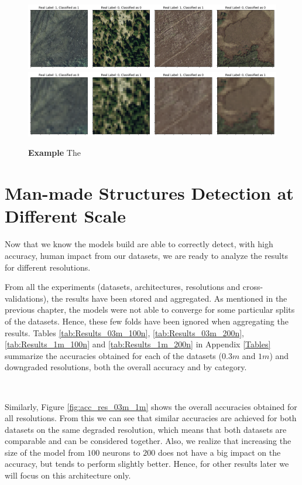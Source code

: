 \begin{figure}[h!]
	\centering
	\captionsetup{width=1\linewidth}
	\includegraphics[width=1\textwidth]{Figures/results/class_dataset03m_res03_comp_correct.png}
	\includegraphics[width=1\textwidth]{Figures/results/class_dataset03m_res48_comp_wrong.png}
	\caption{\textbf{Example} The }
	\label{fig:dataset03m_res03_res48_comp}
\end{figure}


\section{Man-made Structures Detection at Different Scale}

Now that we know the models build are able to correctly detect, with high accuracy, human impact from our datasets, we are ready to analyze the results for different resolutions.

From all the experiments (datasets, architectures, resolutions and cross-validations), the results have been stored and aggregated. As mentioned in the previous chapter, the models were not able to converge for some particular splits of the datasets. Hence, these few folds have been ignored when aggregating the results. Tables \ref{tab:Results_03m_100n}, \ref{tab:Results_03m_200n}, \ref{tab:Results_1m_100n} and \ref{tab:Results_1m_200n} in Appendix \ref{Tables} summarize the accuracies obtained for each of the datasets ($0.3m$ and $1m$) and downgraded resolutions, both the overall accuracy and by category. 

\

Similarly, Figure \ref{fig:acc_res_03m_1m} shows the overall accuracies obtained for all resolutions. From this we can see that similar accuracies are achieved for both datasets on the same degraded resolution, which means that both datasets are comparable and can be considered together. Also, we realize that increasing the size of the model from $100$ neurons to $200$ does not have a big impact on the accuracy, but tends to perform slightly better. Hence, for other results later we will focus on this architecture only.

